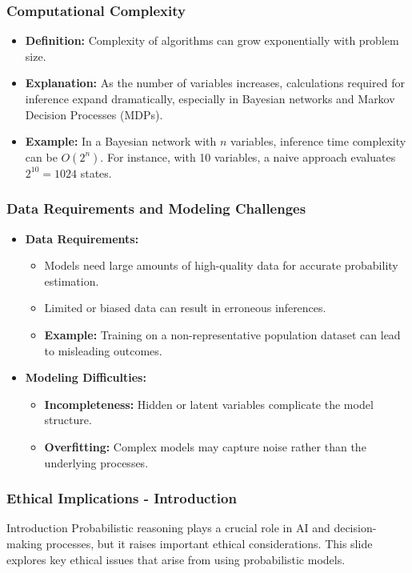 \documentclass[aspectratio=169]{beamer}
\begin{document}
\begin{frame}[fragile]
    \frametitle{Computational Complexity}
    \begin{itemize}
        \item \textbf{Definition:} Complexity of algorithms can grow exponentially with problem size.
        \item \textbf{Explanation:} As the number of variables increases, calculations required for inference expand dramatically, especially in Bayesian networks and Markov Decision Processes (MDPs).
        \item \textbf{Example:} In a Bayesian network with $n$ variables, inference time complexity can be $O(2^n)$. For instance, with 10 variables, a naive approach evaluates $2^{10} = 1024$ states.
    \end{itemize}
\end{frame}

\begin{frame}[fragile]
    \frametitle{Data Requirements and Modeling Challenges}
    \begin{itemize}
        \item \textbf{Data Requirements:}
        \begin{itemize}
            \item Models need large amounts of high-quality data for accurate probability estimation.
            \item Limited or biased data can result in erroneous inferences.
            \item \textbf{Example:} Training on a non-representative population dataset can lead to misleading outcomes.
        \end{itemize}
        \item \textbf{Modeling Difficulties:}
        \begin{itemize}
            \item \textbf{Incompleteness:} Hidden or latent variables complicate the model structure.
            \item \textbf{Overfitting:} Complex models may capture noise rather than the underlying processes.
        \end{itemize}
    \end{itemize}
\end{frame}

\begin{frame}[fragile]
    \frametitle{Ethical Implications - Introduction}
    \begin{block}{Introduction}
        Probabilistic reasoning plays a crucial role in AI and decision-making processes, but it raises important ethical considerations. This slide explores key ethical issues that arise from using probabilistic models.
    \end{block}
\end{frame}
\end{document}
